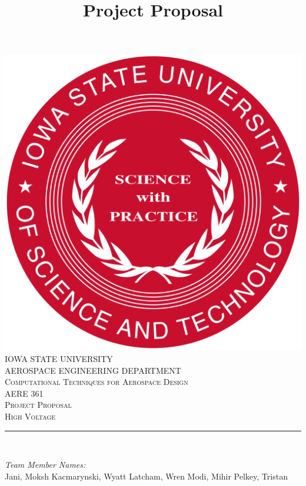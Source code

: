 \documentclass[12pt]{article}
\begin{document}
\title{Project Proposal}

\begin{titlepage}
	\centering
    \vspace*{0.5 cm}
    \includegraphics[scale = 0.11]{isu_seal.png}\\[1.0 cm]	%
    \textsc{\LARGE IOWA STATE UNIVERSITY}\\[2.0 cm]
    \textsc{\large AEROSPACE ENGINEERING DEPARTMENT}\\[0.2 cm]
    \textsc{\large Computational Techniques for Aerospace Design}\\[0.2 cm]
	\textsc{\Large AERE 361}\\[0.5 cm]				%
	\textsc{\Large Project Proposal}\\[0.2 cm]
	\textsc{\Large High Voltage}\\[0.2 cm]
	\rule{\linewidth}{0.2 mm} \\[0.4 cm]
	
	
	\begin{minipage}{0.8\textwidth}
		
			\begin{center}			    
			\emph{Team Member Names:} \\
                Jani, Moksh\linebreak
			Kacmarynski, Wyatt\linebreak
			Latcham, Wren\linebreak
			Modi, Mihir\linebreak
			Pelkey, Tristan\linebreak
			
		\end{center}
	\end{minipage}\\[2 cm]
	
	\vfill
	
\end{titlepage}
\end{document}

